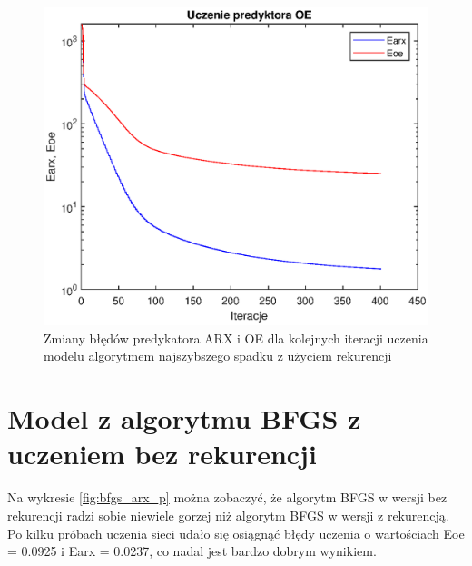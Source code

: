 		\begin{figure}[h!]
			\centering
			\includegraphics[width=\linewidth]{img/NS_OE_p.eps}
			\caption{Zmiany błędów predykatora ARX i OE dla kolejnych iteracji uczenia modelu algorytmem najszybszego spadku z użyciem rekurencji}
			\label{fig:ns_oe_p}
		\end{figure}
		
		\newpage
	\section{Model z algorytmu BFGS z uczeniem bez rekurencji}
		\label{sec:bfgs_arx}
		Na wykresie \ref{fig:bfgs_arx_p} można zobaczyć, że algorytm BFGS w wersji bez rekurencji radzi sobie niewiele gorzej niż algorytm BFGS w wersji z rekurencją. Po kilku próbach uczenia sieci udało się osiągnąć błędy uczenia o wartościach Eoe = 0.0925 i Earx = 0.0237, co nadal jest bardzo dobrym wynikiem.
		
